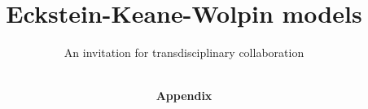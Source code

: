 
\title{Eckstein-Keane-Wolpin models}
\subtitle{An invitation for transdisciplinary collaboration}
\author{\\\Huge{\textbf{Appendix}}}
\date{}

